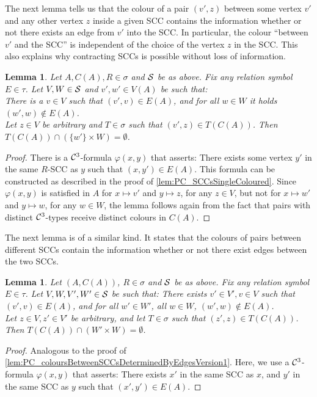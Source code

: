 \documentclass[10pt,a4paper]{article}
\newtheorem{lemma}[theorem]{Lemma}
\renewcommand{\phi}{\varphi}
\renewcommand{\phi}{\varphi}
\newcommand{\Cc}{{\cal C}}
\newcommand{\Ss}{{\cal S}}
\begin{document}
	The next lemma tells us that the colour of a pair $(v',z)$ between some vertex $v'$ and any other vertex $z$ inside a given SCC contains the information whether or not there exists an edge from $v'$ into the SCC. In particular, the colour ``between $v'$ and the SCC'' is independent of the choice of the vertex $z$ in the SCC.
	This also explains why contracting SCCs is possible without loss of information.
	
	\begin{lemma}
		\label{lem:PC_coloursBetweenSCCsDeterminedByEdgesVersion1}
		Let $A,C(A), R \in \sigma$ and $\Ss$ be as above. Fix any relation symbol $E \in \tau$. Let $V,W \in \Ss$ and $v',w' \in V(A)$ be such that:\\
		There is a $v \in V$ such that $(v',v) \in E(A)$, and for all $w \in W$ it holds $(w',w) \notin E(A)$. \\
		Let $z \in V$ be arbitrary and $T \in \sigma$ such that $(v',z) \in T(C(A))$. Then $T(C(A)) \cap (\{w'\} \times W) = \emptyset$.
	\end{lemma}
	\begin{proof}
		There is a $\Cc^3$-formula $\phi(x,y)$ that asserts: There exists some vertex $y'$ in the same $R$-SCC as $y$ such that $(x,y') \in E(A)$. This formula can be constructed as described in the proof of \autoref{lem:PC_SCCsSingleColoured}. Since $\phi(x,y)$ is satisfied in $A$ for $x \mapsto v'$ and $y \mapsto z$, for any $z \in V$, but not for $x \mapsto w'$ and $y \mapsto w$, for any $w \in W$, the lemma follows again from the fact that pairs with distinct $\Cc^3$-types receive distinct colours in $C(A)$.
	\end{proof}
	
	
	
	
	The next lemma is of a similar kind. It states that the colours of pairs between different SCCs contain the information whether or not there exist edges between the two SCCs.
	
	
	\begin{lemma}
		\label{lem:PC_coloursBetweenSCCsDeterminedByEdges}
		Let $(A,C(A))$, $R \in \sigma$ and $\Ss$ be as above. Fix any relation symbol $E \in \tau$. Let $V,W,V',W' \in \Ss$ be such that: There exists $v' \in V', v \in V$ such that $(v',v) \in E(A)$, and for all $w' \in W'$, all $w \in W$, $(w',w) \notin E(A)$.\\
		Let $z \in V, z' \in V'$ be arbitrary, and let $T \in \sigma$ such that $(z',z) \in T(C(A))$. Then $T(C(A)) \cap (W' \times W) = \emptyset$.
	\end{lemma}
	\begin{proof}
		Analogous to the proof of \autoref{lem:PC_coloursBetweenSCCsDeterminedByEdgesVersion1}. Here, we use a $\Cc^3$-formula $\phi(x,y)$ that asserts: There exists $x'$ in the same SCC as $x$, and $y'$ in the same SCC as $y$ such that $(x',y') \in E(A)$.
	\end{proof}
	
\end{document}

